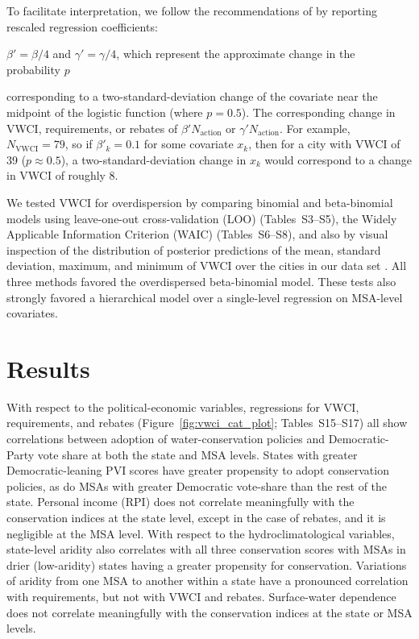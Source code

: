 \documentclass[draft,linenumbers]{agujournal}\usepackage{knitr}
\begin{document}
To facilitate interpretation, we
follow the recommendations of \citet[pp.~81--82]{gelman:arm:2007} by reporting
rescaled regression coefficients:
\iffalse
$\beta' = N_{\text{action}} \beta / 4$ and $\gamma' = N_{\text{action}} \gamma / 4$,
which represent the approximate change in VWCI (or requirements or rebates)
\else
$\beta' = \beta / 4$ and $\gamma' = \gamma / 4$, which represent
the approximate change in the probability $p$
\fi
corresponding to
a two-standard-deviation change of the covariate near the
midpoint of the logistic function (where $p = 0.5$).
The corresponding change in VWCI, requirements, or rebates
of
$\beta' N_{\text{action}}$ or $\gamma' N_{\text{action}}$.
For example, $N_{\text{VWCI}} = 79$,
so if $\beta'_k = 0.1$ for some covariate $x_k$,
then for a city
with VWCI of 39 ($p \approx 0.5$),
a two-standard-deviation change in $x_k$ would correspond
to a change in VWCI of roughly 8.

We tested VWCI for overdispersion by comparing binomial and beta-binomial models
using leave-one-out cross-validation (LOO)
(Tables~S3--S5),
the Widely Applicable Information Criterion (WAIC)
(Tables~S6--S8),
and also by visual inspection of the distribution of posterior predictions of
the mean, standard deviation, maximum, and minimum of VWCI over the cities in
our data set \citep{gelman:bda:2014,gelman:predictive:2014,vehtari:loo:2016}.
All three methods favored the overdispersed beta-binomial model.
These tests also strongly favored a
hierarchical
model over a single-level regression on MSA-level covariates.

\section{Results}
With respect to the political-economic variables, regressions
for VWCI, requirements, and rebates
(Figure~\ref{fig:vwci_cat_plot}; Tables~S15--S17)
all show correlations between
adoption of water-conservation policies and Democratic-Party vote share
at both the state and MSA levels.
States with greater Democratic-leaning PVI scores have greater propensity to adopt conservation policies,
as do MSAs with greater Democratic vote-share than the rest of the state.
Personal income (RPI) does not correlate meaningfully with the conservation indices at the state level, except in the
case of rebates, and it is negligible at the MSA level.
With respect to the hydroclimatological variables, state-level
aridity also correlates with all three conservation scores
with MSAs in drier (low-aridity) states having a greater propensity for conservation.
Variations of aridity from one MSA to another within a state have a pronounced
correlation with requirements, but not with VWCI and rebates.
Surface-water dependence does not correlate meaningfully with the conservation indices
at the state or MSA levels.
\end{document}
